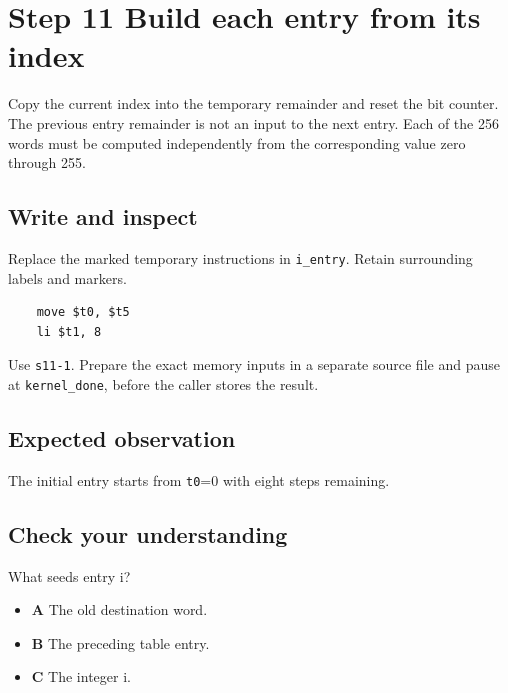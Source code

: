 \section{Step 11 Build each entry from its index}\label{crc-s11}

Copy the current index into the temporary remainder and reset the bit counter. The previous entry remainder is not an input to the next entry. Each of the 256 words must be computed independently from the corresponding value zero through 255.

\subsection{Write and inspect}
Replace the marked temporary instructions in \texttt{i\_entry}. Retain surrounding labels and markers.

\begin{verbatim}
    move $t0, $t5
    li $t1, 8
\end{verbatim}

Use \texttt{s11-1}. Prepare the exact memory inputs in a separate source file and pause at \texttt{kernel\_done}, before the caller stores the result.

\subsection{Expected observation}
The initial entry starts from \texttt{t0}=0 with eight steps remaining.

\subsection{Check your understanding}
What seeds entry i?

\begin{itemize}
\item \textbf{A} The old destination word.
\item \textbf{B} The preceding table entry.
\item \textbf{C} The integer i.
\end{itemize}
